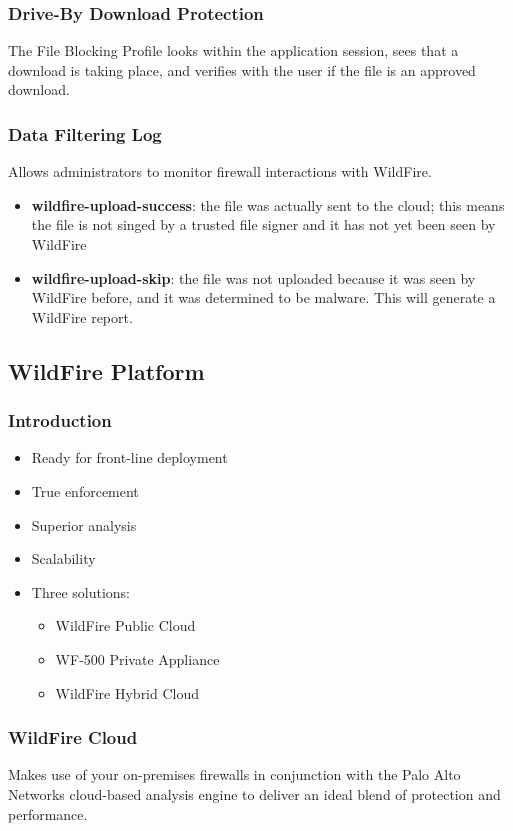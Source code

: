 \subsubsection{Drive-By Download Protection}
The File Blocking Profile looks within the application session, sees that a download is taking place, and verifies with the user if the file is an approved download.
\subsubsection{Data Filtering Log}
Allows administrators to monitor firewall interactions with WildFire.
    \begin{itemize}
        \item \textbf{wildfire-upload-success}: the file was actually sent to the cloud;
        this means the file is not singed by a trusted file signer and it has not yet been seen by WildFire
        \item \textbf{wildfire-upload-skip}: the file was not uploaded because it was seen by WildFire before,
        and it was determined to be malware. This will generate a WildFire report.
    \end{itemize}

\subsection{WildFire Platform}
\subsubsection{Introduction}
    \begin{itemize}
        \item Ready for front-line deployment
        \item True enforcement
        \item Superior analysis
        \item Scalability
        \item Three solutions:
            \begin{itemize}
                \item WildFire Public Cloud
                \item WF-500 Private Appliance
                \item WildFire Hybrid Cloud
            \end{itemize}
    \end{itemize}
\subsubsection{WildFire Cloud}
Makes use of your on-premises firewalls in conjunction with the Palo Alto Networks cloud-based analysis engine to deliver an ideal blend of protection and performance. 

